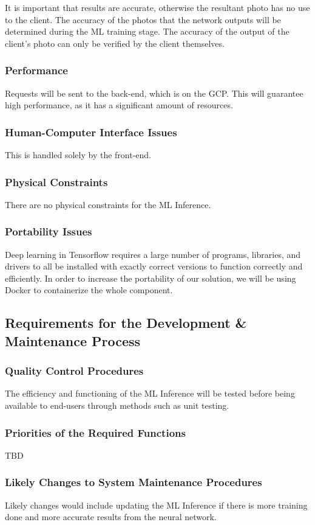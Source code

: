 \documentclass[12pt]{article}
\begin{document}
It is important that results are accurate, otherwise the resultant photo has no use to the client. The accuracy of the photos that the network outputs will be determined during the ML training stage. The accuracy of the output of the client's photo can only be verified by the client themselves.

\subsubsection {Performance}

Requests will be sent to the back-end, which is on the GCP. This will guarantee high performance, as it has a significant amount of resources.

\subsubsection {Human-Computer Interface Issues}

This is handled solely by the front-end.

\subsubsection {Physical Constraints}

There are no physical constraints for the ML Inference.

\subsubsection {Portability Issues}

Deep learning in Tensorflow requires a large number of programs, libraries, and drivers to all be installed with exactly correct versions to function correctly and efficiently. In order to increase the portability of our solution, we will be using Docker to containerize the whole component.

\subsection{Requirements for the Development \& Maintenance Process}

\subsubsection {Quality Control Procedures}

The efficiency and functioning of the ML Inference will be tested before being available to end-users through methods such as unit testing.

\subsubsection {Priorities of the Required Functions}

TBD

\subsubsection {Likely Changes to System Maintenance Procedures}

Likely changes would include updating the ML Inference if there is more training done and more accurate results from the neural network.
\end{document}
